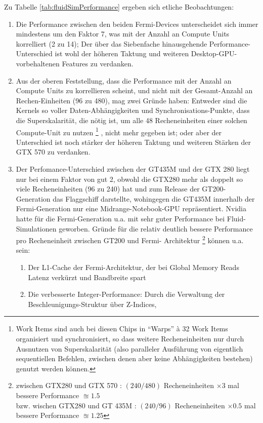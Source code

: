 	Zu Tabelle \ref{tab:fluidSimPerformance} ergeben sich etliche Beobachtungen:
	\begin{enumerate}
		\item Die Performance zwischen den beiden Fermi-Devices unterscheidet sich immer mindestens um den Faktor 7,
		was mit der Anzahl an Compute Units korrelliert (2 zu 14); Der über das Siebenfache hinausgehende
		Performance-Unterschied ist wohl der höheren Taktung und weiteren Desktop-GPU- vorbehaltenen Features zu verdanken.
		\item Aus der oberen Feststellung, dass die Performance mit der Anzahl an Compute Units zu korrellieren scheint,
		und nicht mit der Gesamt-Anzahl an Rechen-Einheiten (96 zu 480), mag zwei Gründe haben: Entweder sind die
		Kernels so voller Daten-Abhängigkeiten und Synchronisations-Punkte, dass die Superskalarität, die nötig ist, um 
		alle 48 Recheneinheiten einer solchen Compute-Unit zu nutzen 
		\footnote{Work Items sind auch bei diesen Chips in "`Warps"' à 32 Work Items organisiert und synchronisiert, so 
		dass weitere Recheneinheiten nur durch Ausnutzen von Superskalarität 
		(also paralleler Ausführung von eigentlich sequentiellen Befehlen, zwischen denen aber keine Abhängigkeiten
		bestehen) genutzt werden können.}
		, nicht mehr gegeben ist;
		oder aber der Unterschied ist noch stärker der höheren Taktung und weiteren Stärken der GTX 570 zu verdanken.
		\item Der Perfomance-Unterschied zwischen der GT435M und der GTX 280 liegt nur bei einem Faktor von gut 2,
		obwohl die GTX280 mehr als doppelt so viele Recheneinheiten (96 zu 240) hat und zum Release der GT200-Generation
		das Flaggschiff darstellte, wohingegen die GT435M innerhalb der Fermi-Generation nur eine Midrange-Notebook-GPU
		repräsentiert. Nvidia hatte für die Fermi-Generation u.a. mit sehr guter Performance bei Fluid-Simulationen
		geworben. Gründe für die relativ deutlich bessere Performance pro Recheneinheit zwischen GT200 und Fermi-
		Architektur 
		\footnote{
			zwischen GTX280 und GTX 570 :  
			$(240/480)$ Recheneinheiten $ \times 3 $ mal bessere Performance $ \approxeq 1.5 $ \\
			bzw. wischen GTX280 und GT 435M :  
			$(240/96)$ Recheneinheiten $ \times 0.5 $ mal bessere Performance $ \approxeq 1.25 $
		} können u.a. sein:
		\begin{enumerate}
			\item Der L1-Cache der Fermi-Architektur, der bei Global Memory Reads Latenz verkürzt und Bandbreite spart
			\item Die verbesserte Integer-Performance: Durch die Verwaltung der Beschleunigungs-Struktur über Z-Indices,

\end{enumerate}
\end{enumerate}

